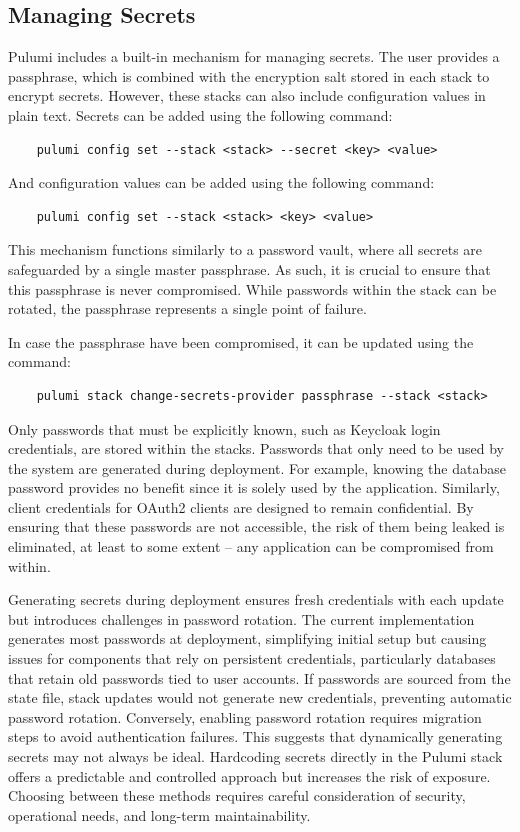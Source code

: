 \subsection{Managing Secrets}
Pulumi includes a built-in mechanism for managing secrets. The user provides a passphrase, which is combined with the encryption salt stored in each stack to encrypt secrets. However, these stacks can also include configuration values in plain text. Secrets can be added using the following command:

\begin{verbatim}
    pulumi config set --stack <stack> --secret <key> <value>
\end{verbatim}

And configuration values can be added using the following command:

\begin{verbatim}
    pulumi config set --stack <stack> <key> <value>
\end{verbatim}

This mechanism functions similarly to a password vault, where all secrets are safeguarded by a single master passphrase. As such, it is crucial to ensure that this passphrase is never compromised. While passwords within the stack can be rotated, the passphrase represents a single point of failure.

In case the passphrase have been compromised, it can be updated using the command:

\begin{verbatim}
    pulumi stack change-secrets-provider passphrase --stack <stack>
\end{verbatim}

Only passwords that must be explicitly known, such as Keycloak login credentials, are stored within the stacks. Passwords that only need to be used by the system are generated during deployment. For example, knowing the database password provides no benefit since it is solely used by the application. Similarly, client credentials for OAuth2 clients are designed to remain confidential. By ensuring that these passwords are not accessible, the risk of them being leaked is eliminated, at least to some extent -- any application can be compromised from within.

Generating secrets during deployment ensures fresh credentials with each update but introduces challenges in password rotation. The current implementation generates most passwords at deployment, simplifying initial setup but causing issues for components that rely on persistent credentials, particularly databases that retain old passwords tied to user accounts. If passwords are sourced from the state file, stack updates would not generate new credentials, preventing automatic password rotation. Conversely, enabling password rotation requires migration steps to avoid authentication failures. This suggests that dynamically generating secrets may not always be ideal. Hardcoding secrets directly in the Pulumi stack offers a predictable and controlled approach but increases the risk of exposure. Choosing between these methods requires careful consideration of security, operational needs, and long-term maintainability.


